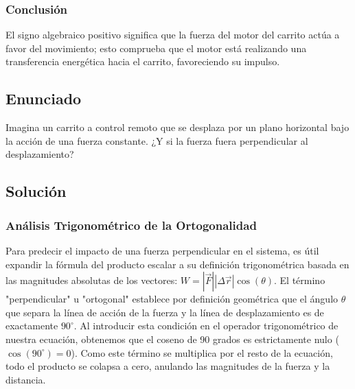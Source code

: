\documentclass[a4paper,12pt]{article}
\begin{document}
\subsubsection*{Conclusión}
El signo algebraico positivo significa que la fuerza del motor del carrito actúa a favor del movimiento; esto comprueba que el motor está realizando una transferencia energética hacia el carrito, favoreciendo su impulso.

\newpage
\subsection*{Enunciado}
Imagina un carrito a control remoto que se desplaza por un plano horizontal bajo la acción de una fuerza constante.
¿Y si la fuerza fuera perpendicular al desplazamiento?

\subsection*{Solución}

\subsubsection*{Análisis Trigonométrico de la Ortogonalidad}
Para predecir el impacto de una fuerza perpendicular en el sistema, es útil expandir la fórmula del producto escalar a su definición trigonométrica basada en las magnitudes absolutas de los vectores: $W = |\vec{F}| |\Delta\vec{r}| \cos(\theta)$. 
El término "perpendicular" u "ortogonal" establece por definición geométrica que el ángulo $\theta$ que separa la línea de acción de la fuerza y la línea de desplazamiento es de exactamente $90^\circ$. Al introducir esta condición en el operador trigonométrico de nuestra ecuación, obtenemos que el coseno de 90 grados es estrictamente nulo ($\cos(90^\circ) = 0$). Como este término se multiplica por el resto de la ecuación, todo el producto se colapsa a cero, anulando las magnitudes de la fuerza y la distancia.
\end{document}
